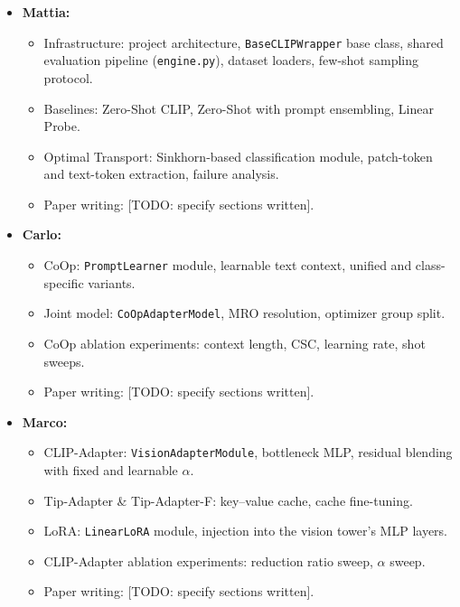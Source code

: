 \documentclass[10pt,twocolumn,letterpaper]{article}
\begin{document}
\begin{itemize}
  \item \textbf{Mattia:}
    \begin{itemize}
      \item Infrastructure: project architecture, \texttt{BaseCLIPWrapper}
        base class, shared evaluation pipeline (\texttt{engine.py}),
        dataset loaders, few-shot sampling protocol.
      \item Baselines: Zero-Shot CLIP, Zero-Shot with prompt ensembling,
        Linear Probe.
      \item Optimal Transport: Sinkhorn-based classification module,
        patch-token and text-token extraction, failure analysis.
      \item Paper writing: [TODO: specify sections written].
    \end{itemize}
  \item \textbf{Carlo:}
    \begin{itemize}
      \item CoOp: \texttt{PromptLearner} module, learnable text context,
        unified and class-specific variants.
      \item Joint model: \texttt{CoOpAdapterModel}, MRO resolution,
        optimizer group split.
      \item CoOp ablation experiments: context length, CSC, learning rate,
        shot sweeps.
      \item Paper writing: [TODO: specify sections written].
    \end{itemize}
  \item \textbf{Marco:}
    \begin{itemize}
      \item CLIP-Adapter: \texttt{VisionAdapterModule}, bottleneck MLP,
        residual blending with fixed and learnable $\alpha$.
      \item Tip-Adapter \& Tip-Adapter-F: key--value cache, cache
        fine-tuning.
      \item LoRA: \texttt{LinearLoRA} module, injection into the vision
        tower's MLP layers.
      \item CLIP-Adapter ablation experiments: reduction ratio sweep,
        $\alpha$ sweep.
      \item Paper writing: [TODO: specify sections written].
    \end{itemize}
\end{itemize}



{\small



}
\end{document}
